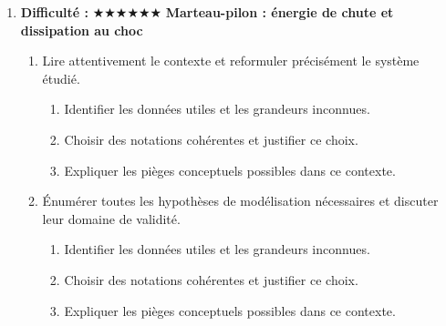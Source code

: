 \documentclass[11pt,a4paper]{article}
\newcommand{\etoiles}[1]{\textbf{Difficulté : }#1}
\begin{document}
\begin{enumerate}[label=\textbf{Très long \arabic*.},leftmargin=*]
\begin{enumerate}[label=\textbf{\arabic*)}]
\item Imaginer un protocole expérimental ou numérique permettant de confronter le modèle à des mesures.
\begin{enumerate}[label=\alph*)]
\item Comparer au moins deux scénarios différents.
\item Discuter la robustesse du résultat face à une variation de paramètre.
\item Proposer une ouverture vers une situation réelle plus complexe.
\end{enumerate}
\item Rédiger une conclusion scientifique : résultats, limites, prolongements vers la Terminale ou au-delà.
\begin{enumerate}[label=\alph*)]
\item Comparer au moins deux scénarios différents.
\item Discuter la robustesse du résultat face à une variation de paramètre.
\item Proposer une ouverture vers une situation réelle plus complexe.
\end{enumerate}
\end{enumerate}
\item \etoiles{★★★★★★}
\textbf{Marteau-pilon : énergie de chute et dissipation au choc}
\begin{enumerate}[label=\textbf{\arabic*)}]
\item Lire attentivement le contexte et reformuler précisément le système étudié.
\begin{enumerate}[label=\alph*)]
\item Identifier les données utiles et les grandeurs inconnues.
\item Choisir des notations cohérentes et justifier ce choix.
\item Expliquer les pièges conceptuels possibles dans ce contexte.
\end{enumerate}
\item Énumérer toutes les hypothèses de modélisation nécessaires et discuter leur domaine de validité.
\begin{enumerate}[label=\alph*)]
\item Identifier les données utiles et les grandeurs inconnues.
\item Choisir des notations cohérentes et justifier ce choix.
\item Expliquer les pièges conceptuels possibles dans ce contexte.
\end{enumerate}

\end{enumerate}
\end{enumerate}
\end{document}
